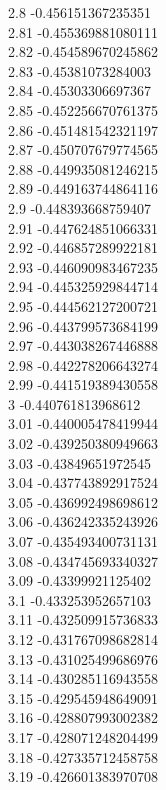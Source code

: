 {2.8	-0.456151367235351\\
2.81	-0.455369881080111\\
2.82	-0.454589670245862\\
2.83	-0.45381073284003\\
2.84	-0.45303306697367\\
2.85	-0.452256670761375\\
2.86	-0.451481542321197\\
2.87	-0.450707679774565\\
2.88	-0.449935081246215\\
2.89	-0.449163744864116\\
2.9	-0.448393668759407\\
2.91	-0.447624851066331\\
2.92	-0.446857289922181\\
2.93	-0.446090983467235\\
2.94	-0.445325929844714\\
2.95	-0.444562127200721\\
2.96	-0.443799573684199\\
2.97	-0.443038267446888\\
2.98	-0.442278206643274\\
2.99	-0.441519389430558\\
3	-0.440761813968612\\
3.01	-0.440005478419944\\
3.02	-0.439250380949663\\
3.03	-0.43849651972545\\
3.04	-0.437743892917524\\
3.05	-0.436992498698612\\
3.06	-0.436242335243926\\
3.07	-0.435493400731131\\
3.08	-0.434745693340327\\
3.09	-0.43399921125402\\
3.1	-0.433253952657103\\
3.11	-0.432509915736833\\
3.12	-0.431767098682814\\
3.13	-0.431025499686976\\
3.14	-0.430285116943558\\
3.15	-0.429545948649091\\
3.16	-0.428807993002382\\
3.17	-0.428071248204499\\
3.18	-0.427335712458758\\
3.19	-0.426601383970708\\
}
